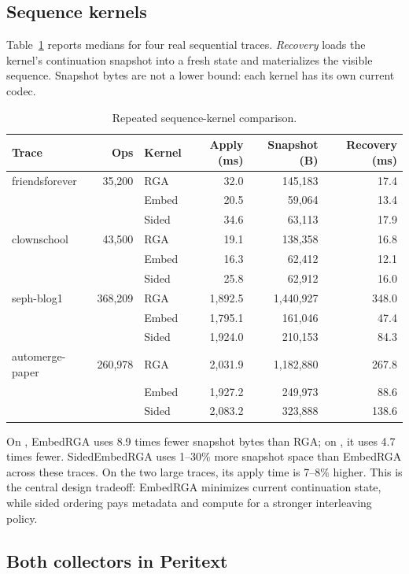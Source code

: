 \subsection{Sequence kernels}

Table~\ref{tab:kernels} reports medians for four real sequential traces.
\emph{Recovery} loads the kernel's continuation snapshot into a fresh state
and materializes the visible sequence. Snapshot bytes are not a lower bound:
each kernel has its own current codec.

\begin{table}[H]
\centering
\small
\begin{tabular}{@{}lrlrrr@{}}
\toprule
Trace & Ops & Kernel & Apply (ms) & Snapshot (B) & Recovery (ms) \\
\midrule
friendsforever & 35,200 & RGA & 32.0 & 145,183 & 17.4 \\
 & & Embed & 20.5 & 59,064 & 13.4 \\
 & & Sided & 34.6 & 63,113 & 17.9 \\
clownschool & 43,500 & RGA & 19.1 & 138,358 & 16.8 \\
 & & Embed & 16.3 & 62,412 & 12.1 \\
 & & Sided & 25.8 & 62,912 & 16.0 \\
seph-blog1 & 368,209 & RGA & 1,892.5 & 1,440,927 & 348.0 \\
 & & Embed & 1,795.1 & 161,046 & 47.4 \\
 & & Sided & 1,924.0 & 210,153 & 84.3 \\
automerge-paper & 260,978 & RGA & 2,031.9 & 1,182,880 & 267.8 \\
 & & Embed & 1,927.2 & 249,973 & 88.6 \\
 & & Sided & 2,083.2 & 323,888 & 138.6 \\
\bottomrule
\end{tabular}
\caption{Repeated sequence-kernel comparison.}
\label{tab:kernels}
\end{table}

On , EmbedRGA uses 8.9 times fewer snapshot bytes than RGA;
on , it uses 4.7 times fewer. SidedEmbedRGA uses
1--30\% more snapshot space than EmbedRGA across these traces. On the two
large traces, its apply time is 7--8\% higher. This is the central design
tradeoff: EmbedRGA minimizes current continuation state, while sided ordering
pays metadata and compute for a stronger interleaving policy.

\subsection{Both collectors in Peritext}

